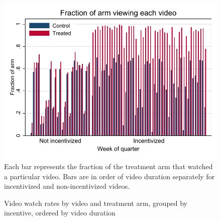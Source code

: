 \documentclass[12pt]{article}
\begin{document}
\clearpage
\begin{figure}[t]
\begin{center}
\caption{Video watch rates by video and treatment arm, grouped by incentive, ordered by video duration}
\label{video_cdf_duration}
\includegraphics[width=1\textwidth, angle=0]{../plots/bar_uviews_duration.pdf}
\footnotesize Each bar represents the fraction of the treatment arm that watched a particular video. Bars are in order of video duration separately for incentivized and non-incentivized videos.
\end{center}
\end{figure}
\end{document}
